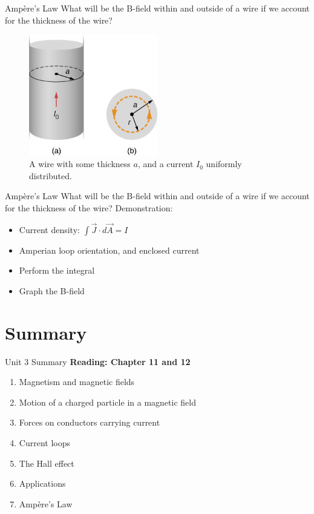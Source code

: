 \documentclass{beamer}
\begin{document}
\begin{frame}{Amp\`{e}re's Law}
What will be the B-field within and outside of a wire if we account for the thickness of the wire?
\begin{figure}
\centering
\includegraphics[width=0.5\textwidth]{figures/amplaw2.jpeg}
\caption{\label{fig:amplaw2} A wire with some thickness $a$, and a current $I_0$ uniformly distributed.}
\end{figure}
\end{frame}

\begin{frame}{Amp\`{e}re's Law}
What will be the B-field within and outside of a wire if we account for the thickness of the wire? \alert{Demonstration:}
\begin{itemize}
\item Current density: $\int \vec{J} \cdot d\vec{A} = I$
\item Amperian loop orientation, and enclosed current
\item Perform the integral
\item Graph the B-field
\end{itemize}
\end{frame}

\section{Summary}

\begin{frame}{Unit 3 Summary}
\textbf{Reading: Chapter 11 and 12}
\begin{enumerate}
\item Magnetism and magnetic fields
\item Motion of a charged particle in a magnetic field
\item Forces on conductors carrying current
\item Current loops
\item The Hall effect
\item Applications
\item Amp\`{e}re's Law
\end{enumerate}
\end{frame}
\end{document}
